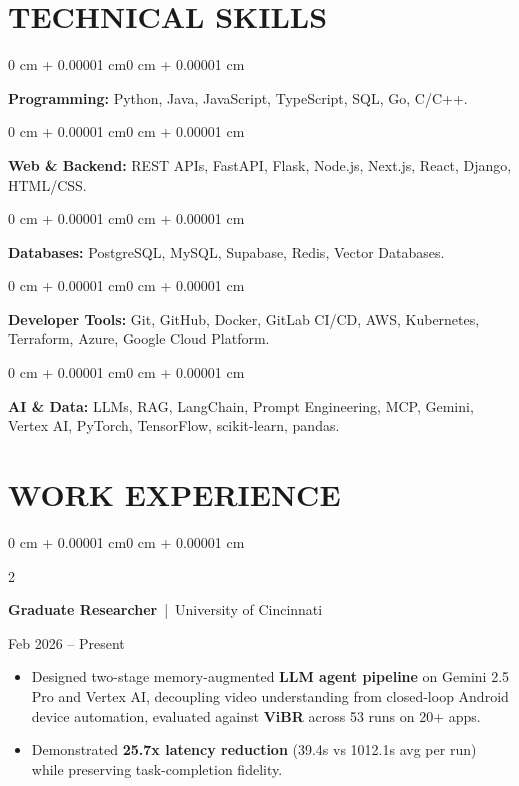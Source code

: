\documentclass[10pt, letterpaper]{article}
\newenvironment{highlights}{
    \begin{itemize}[
        topsep=0.10 cm,
        parsep=0.06 cm,
        partopsep=0pt,
        itemsep=0.06 cm,
        leftmargin=12pt
    ]
}{
    \end{itemize}
}
\newenvironment{onecolentry}{
    \begin{adjustwidth}{0 cm + 0.00001 cm}{0 cm + 0.00001 cm}
}{
    \end{adjustwidth}
}
\newenvironment{twocolentry}[2][]{
    \onecolentry
    \def\secondColumn{#2}
    \setcolumnwidth{\fill, 4.5 cm}
    \begin{paracol}{2}
}{
    \switchcolumn \raggedleft \secondColumn
    \end{paracol}
    \endonecolentry
}
\begin{document}
\section{TECHNICAL SKILLS}
\begin{onecolentry}
\textbf{Programming:} Python, Java, JavaScript, TypeScript, SQL, Go, C/C++.
\end{onecolentry}
\vspace{0.06 cm}
\begin{onecolentry}
\textbf{Web \& Backend:} REST APIs, FastAPI, Flask, Node.js, Next.js, React, Django, HTML/CSS.
\end{onecolentry}
\vspace{0.06 cm}
\begin{onecolentry}
\textbf{Databases:} PostgreSQL, MySQL, Supabase, Redis, Vector Databases.
\end{onecolentry}
\vspace{0.06 cm}
\begin{onecolentry}
\textbf{Developer Tools:} Git, GitHub, Docker, GitLab CI/CD, AWS, Kubernetes, Terraform, Azure, Google Cloud Platform.
\end{onecolentry}
\vspace{0.06 cm}
\begin{onecolentry}
\textbf{AI \& Data:} LLMs, RAG, LangChain, Prompt Engineering, MCP, Gemini, Vertex AI, PyTorch, TensorFlow, scikit-learn, pandas.
\end{onecolentry}

\section{WORK EXPERIENCE}
\begin{twocolentry}{Feb 2026 -- Present}
\textbf{Graduate Researcher} \,|\, University of Cincinnati
\end{twocolentry}
\begin{highlights}
  \item Designed two-stage memory-augmented \textbf{LLM agent pipeline} on Gemini 2.5 Pro and Vertex AI, decoupling video understanding from closed-loop Android device automation, evaluated against \textbf{ViBR} across 53 runs on 20+ apps.
  \item Demonstrated \textbf{25.7x latency reduction} (39.4s vs 1012.1s avg per run) while preserving task-completion fidelity.
\end{highlights}
\end{document}
